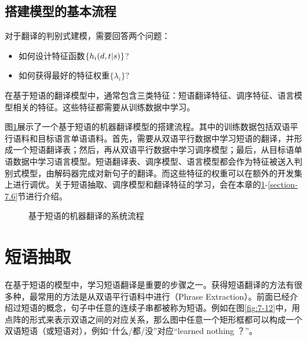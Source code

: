 \subsection{搭建模型的基本流程}

\parinterval 对于翻译的判别式建模，需要回答两个问题：

\begin{itemize}
\vspace{0.5em}
\item 如何设计特征函数$\{h_i(d,{t}|{s})\}$?
\vspace{0.5em}
\item 如何获得最好的特征权重$\{\lambda_i\}$?
\vspace{0.5em}
\end{itemize}

在基于短语的翻译模型中，通常包含三类特征：短语翻译特征、调序特征、语言模型相关的特征。这些特征都需要从训练数据中学习。

\parinterval 图\ref{fig:7-11}展示了一个基于短语的机器翻译模型的搭建流程。其中的训练数据包括双语平行语料和目标语言单语语料。首先，需要从双语平行数据中学习短语的翻译，并形成一个短语翻译表；然后，再从双语平行数据中学习调序模型；最后，从目标语单语数据中学习语言模型。短语翻译表、调序模型、语言模型都会作为特征被送入判别式模型，由解码器完成对新句子的翻译。而这些特征的权重可以在额外的开发集上进行调优。关于短语抽取、调序模型和翻译特征的学习，会在本章的\ref{section-7.3}-\ref{section-7.6}节进行介绍。

\begin{figure}[htp]
\centering

\caption{基于短语的机器翻译的系统流程}
\label{fig:7-11}
\end{figure}


\sectionnewpage
\section{短语抽取}\label{section-7.3}

\parinterval 在基于短语的模型中，学习短语翻译是重要的步骤之一。获得短语翻译的方法有很多种，最常用的方法是从双语平行语料中进行{\small{}}（Phrase Extraction）。前面已经介绍过短语的概念，句子中任意的连续子串都被称为短语。例如在图\ref{fig:7-12}中，用点阵的形式来表示双语之间的对应关系，那么图中任意一个矩形框都可以构成一个双语短语（或短语对），例如“什么/都/没”对应“learned nothing ？”。

